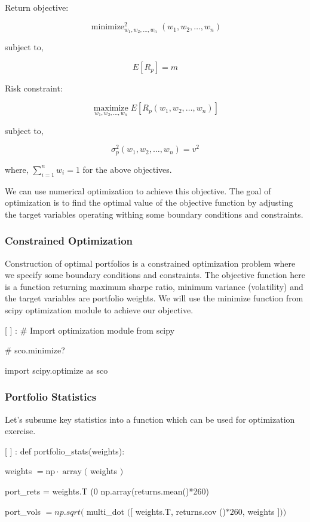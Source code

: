 \documentclass[10pt]{article}
\begin{document}
Return objective:

$$
\operatorname{minimize}_{w_{1}, w_{2}, \ldots, w_{n}}^{2}\left(w_{1}, w_{2}, \ldots, w_{n}\right)
$$

subject to,

$$
E\left[R_{p}\right]=m
$$

Risk constraint:

$$
\underset{w_{1}, w_{2}, \ldots, w_{n}}{\operatorname{maximize}} E\left[R_{p}\left(w_{1}, w_{2}, \ldots, w_{n}\right)\right]
$$

subject to,

$$
\sigma_{p}^{2}\left(w_{1}, w_{2}, \ldots, w_{n}\right)=v^{2}
$$

where, $\sum_{i=1}^{n} w_{i}=1$ for the above objectives.

We can use numerical optimization to achieve this objective. The goal of optimization is to find the optimal value of the objective function by adjusting the target variables operating withing some boundary conditions and constraints.

\subsubsection*{Constrained Optimization}
Construction of optimal portfolios is a constrained optimization problem where we specify some boundary conditions and constraints. The objective function here is a function returning maximum sharpe ratio, minimum variance (volatility) and the target variables are portfolio weights. We will use the minimize function from scipy optimization module to achieve our objective.

[ ] : \# Import optimization module from scipy

\# sco.minimize?

import scipy.optimize as sco

\subsubsection*{Portfolio Statistics}
Let's subsume key statistics into a function which can be used for optimization exercise.

[ ] : def portfolio\_stats(weights):

weights $=\mathrm{np} \cdot \operatorname{array}($ weights $)$

port\_rets = weights.T (0 np.array(returns.mean()*260)

port\_vols $=n p . s q r t($ multi\_dot $([$ weights.T, returns.cov ()$* 260$, weights $]))$
\end{document}

